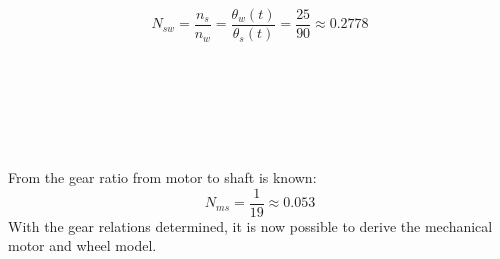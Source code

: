 \begin{equation}	
N_{sw} = \frac{n_s}{n_w} = \frac{\theta_w(t)}{\theta_s(t)} = \frac{25}{90} \approx 0.2778
\label{Nsw}
\end{equation}
\begin{where}
\\
\\
\\
\\
\\
\end{where}

From \citep{gear} the gear ratio from motor to shaft is known:
\begin{equation}
N_{ms} = \frac{1}{19} \approx 0.053
\label{Nms}
\end{equation}
With the gear relations determined, it is now possible to derive the mechanical motor and wheel model.
\vspace{0.4 cm}
